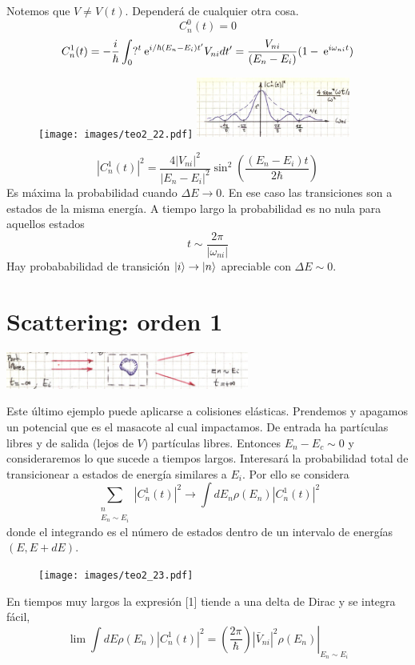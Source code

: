 \documentclass[10pt,oneside]{CBFT_book}
\begin{document}
Notemos que $V\neq V(t)$. Dependerá de cualquier otra cosa.
\[
	C^0_n(t) = 0
\]
\[
	C^1_n(t) = -\frac{i}{\hbar} \int_0?^t \:\mathrm{e}^{i/\hbar(E_n - E_i)t'} V_{ni} dt'=
	\frac{V_{ni}}{(E_n - E_i)}(1-\:\mathrm{e}^{i\omega_{ni}t})
\]
\begin{figure}[htb]
	\begin{center}
	\texttt{[image: images/teo2\_22.pdf]}
	\includegraphics[width=0.45\textwidth]{images/fig_ft2_potencial_abrupto.jpg}
	\end{center}
	\caption{}
\end{figure} 
\[
	|C^1_n(t)|^2 = \frac{4|V_{ni}|^2}{| E_n - E_i|^2}\sin^2\left(\frac{(E_n - E_i)t}{2\hbar}\right) 
\]
Es máxima la probabilidad cuando $\Delta E\to 0$. En ese caso las transiciones son a estados de la misma 
energía. A tiempo largo la probabilidad es no nula para aquellos estados 
\[
	t \sim \frac{2\pi}{|\omega_{ni}|}
\]
Hay probababilidad de transición $\Ket{i} \to \Ket{n}$ apreciable con $\Delta E \sim 0$.

\section{Scattering: orden 1}


\includegraphics[width=0.6\textwidth]{images/fig_ft2_scattering_intro.jpg}

Este último ejemplo puede aplicarse a colisiones elásticas. Prendemos y apagamos un potencial que es el 
masacote al cual impactamos. De entrada ha partículas libres y de salida (lejos de $V$) partículas libres.
Entonces $ E_n - E_c \sim 0$ y consideraremos lo que sucede a tiempos largos. Interesará la probabilidad 
total de transicionear a estados de energía similares a $E_i$. Por ello se considera 
\[
	\sum_{\substack{n \\ E_n\sim E_i}} |C^1_n(t)|^2 \longrightarrow \int dE_n \rho(E_n) |C^1_n(t)|^2
\]
donde el integrando es el número de estados dentro de un intervalo de energías $(E,E+dE)$.
\begin{figure}[htb]
	\begin{center}
	\texttt{[image: images/teo2\_23.pdf]}
	\end{center}
	\caption{}
\end{figure} 
En tiempos muy largos la expresión [1] tiende a una delta de Dirac y se integra fácil,
\[
	\lim  \int dE\rho(E_n) |C^1_n(t)|^2 = \left.\left(\frac{2\pi}{\hbar}\right)
		|\bar{V}_{ni}|^2 \rho(E_n)\right|_{E_n\sim E_i}
\]
\end{document}
